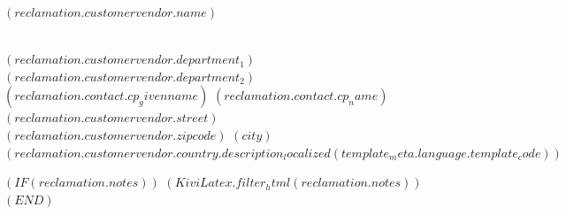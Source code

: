 \documentclass[paper=a4,fontsize=10pt]{scrartcl}
\begin{document}
\begin{letter}{
  $( reclamation.customervendor.name )$               \strut\\
  $( reclamation.customervendor.department_1 )$       \ifhmode\\\fi
  $( reclamation.customervendor.department_2 )$       \ifhmode\\\fi
  $( reclamation.contact.cp_givenname )$ $( reclamation.contact.cp_name )$ \ifhmode\\\fi
  $( reclamation.customervendor.street )$             \ifhmode\\\fi
  $( reclamation.customervendor.zipcode )$ $( city )$ \ifhmode\\\fi
  $( reclamation.customervendor.country.description_localized(template_meta.language.template_code) )$ %
    }

    \opening{
    }
    \thispagestyle{kivitendo.letter.first}

    \ekreklamationsformel

    $( IF (reclamation.notes) )$%
    $( KiviLatex.filter_html(reclamation.notes) )$%
      \medskip
    $( END )$%


\end{letter}
\end{document}
